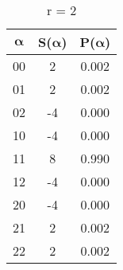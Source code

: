 \begin{table}[h]
\begin{subtable}{.3\textwidth}
        \centering
        \caption{r = 2}
        \begin{tabular}{ccc}
            \toprule
             $\boldsymbol{\alpha}$ & S($\boldsymbol{\alpha}$) & P($\boldsymbol{\alpha}$)\\
            \midrule
            00 & 2 & 0.002 \\
            01 & 2 & 0.002 \\
            02 & -4 & 0.000 \\
            10 & -4 & 0.000 \\
            11 & 8 & 0.990 \\
            12 & -4 & 0.000 \\
            20 & -4 & 0.000 \\
            21 & 2 & 0.002 \\
            22 & 2 & 0.002 \\
          \bottomrule
        \end{tabular}
    \end{subtable}
\end{table}
